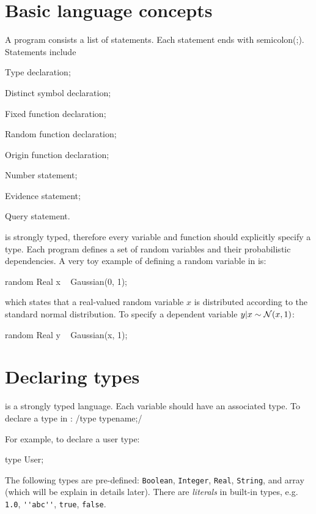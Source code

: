\documentclass[12pt]{article}
\begin{document}
\section{Basic language concepts}
A \bl program consists a list of statements.
Each statement ends with semicolon(;). 
Statements include 
\begin{enumerate*}
\item Type declaration; 
\item Distinct symbol declaration;
\item Fixed function declaration;
\item Random function declaration;
\item Origin function declaration;
\item Number statement;
\item Evidence statement;
\item Query statement.
\end{enumerate*}

\bl is strongly typed, therefore every variable and function should explicitly specify a type.
Each \bl program defines a set of random variables and their probabilistic dependencies. 
A very toy example of defining a random variable in \bl is:

\begin{blogcode}
random Real x ~ Gaussian(0, 1);
\end{blogcode}
which states that a real-valued random variable $x$ is distributed according to the standard normal distribution. 
To specify a dependent variable $y | x \sim \mathcal{N}(x, 1)$:
\begin{blogcode}
random Real y ~ Gaussian(x, 1);
\end{blogcode}

\section{Declaring types}
\bl is a strongly typed language. Each variable should have an associated type.
 To declare a type in \bl:
\blog/type typename;/

For example, to declare a user type:
\begin{blogcode}
type User;
\end{blogcode}

The following types are pre-defined: \verb|Boolean|, \verb|Integer|, \verb|Real|, \verb|String|, and array (which will be explain in details later).
There are \emph{literals} in built-in types, e.g. \verb|1.0|, \verb|''abc''|, \verb|true|, \verb|false|.
\end{document}
